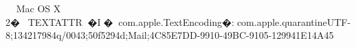     Mac OS X            	   2   �         TEXT                              ATTR         �   I                  �     com.apple.TextEncoding      �   :  com.apple.quarantine UTF-8;134217984q/0043;50f5294d;Mail;4C85E7DD-9910-49BC-9105-129941E14A45 